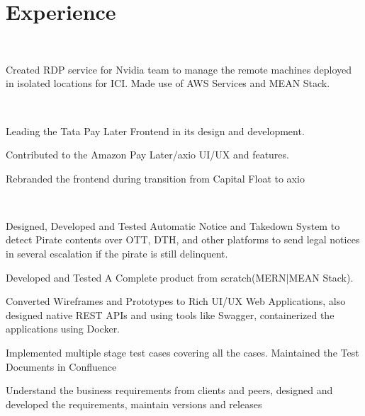 \documentclass[]{deedy-resume-openfont}
\begin{document}
\hfill
\begin{minipage}[t]{0.66\textwidth} 


\section{Experience}

\sectionsep\\
\vspace{\topsep} %
\begin{tightemize}
\item Created RDP service for Nvidia team to manage the remote machines deployed in isolated locations for ICI. Made use of AWS Services and MEAN Stack.
\end{tightemize}
\sectionsep

\sectionsep\\
\vspace{\topsep} %
\begin{tightemize}
\item Leading the Tata Pay Later Frontend in its design and development.
\item Contributed to the Amazon Pay Later/axio UI/UX and features.
\item Rebranded the frontend during transition from Capital Float to axio
\end{tightemize}
\sectionsep

\sectionsep\\
\vspace{\topsep} %
\begin{tightemize}
\item Designed, Developed and Tested Automatic Notice and Takedown System to detect Pirate contents over OTT, DTH, and other platforms to send legal notices in several escalation if the pirate is still delinquent.
\item Developed and Tested A Complete product from scratch(MERN|MEAN Stack).
\item Converted Wireframes and Prototypes to Rich UI/UX Web Applications, also designed native REST APIs and using tools like Swagger, containerized the applications using Docker. 
\item Implemented multiple stage test cases covering all the cases. Maintained the Test Documents in Confluence
\item Understand the business requirements from clients and peers, designed and developed the requirements, maintain versions and releases 
\end{tightemize}
\sectionsep


\end{minipage}
\end{document}
